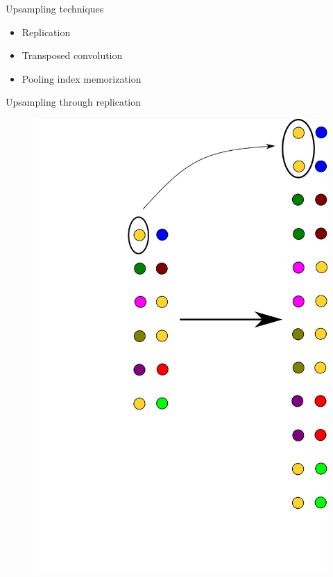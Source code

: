 \documentclass[xcolor=pdftex,dvipsnames,table,mathserif]{beamer}
\begin{document}
\begin{frame}{Upsampling techniques}


\begin{itemize}
\item Replication
\item Transposed convolution
\item Pooling index memorization
\end{itemize}

\end{frame}

\begin{frame}{Upsampling through replication}

  \begin{figure}
      \includegraphics[height=0.8\textheight]{upsampling.png}
    \end{figure}

\end{frame}
\end{document}
